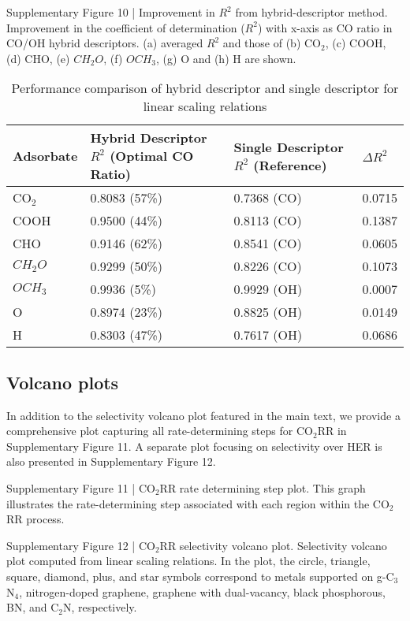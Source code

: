 Supplementary Figure 10 | Improvement in $R^2$ from hybrid-descriptor method. Improvement in the coefficient of determination ($R^2$) with x-axis as CO ratio in CO/OH hybrid descriptors. (a) averaged $R^2$ and those of (b) CO$_2$, (c) COOH, (d) CHO, (e) $CH_2O$, (f) $OCH_3$, (g) O and (h) H are shown.

\begin{table}[h]
  \centering
  \begin{tabular}{*{4}{l}}
    \hline
    Adsorbate & Hybrid Descriptor $R^2$ (Optimal CO Ratio) & Single Descriptor $R^2$ (Reference) & $\Delta R^2$ \\
    \hline
    CO$_2$    & 0.8083 (57\%)  & 0.7368 (CO)  & 0.0715 \\
    COOH      & 0.9500 (44\%)  & 0.8113 (CO)  & 0.1387 \\
    CHO       & 0.9146 (62\%)  & 0.8541 (CO)  & 0.0605 \\
    $CH_2O$   & 0.9299 (50\%)  & 0.8226 (CO)  & 0.1073 \\
    $OCH_3$   & 0.9936 (5\%)   & 0.9929 (OH)  & 0.0007 \\
    O         & 0.8974 (23\%)  & 0.8825 (OH)  & 0.0149 \\
    H         & 0.8303 (47\%)  & 0.7617 (OH)  & 0.0686 \\
    \hline
  \end{tabular}
  \caption{Performance comparison of hybrid descriptor and single descriptor for linear scaling relations}
  \label{si_table14}
\end{table}


\subsection{Volcano plots}
In addition to the selectivity volcano plot featured in the main text, we provide a comprehensive plot capturing all rate-determining steps for CO$_2$RR in Supplementary Figure 11. A separate plot focusing on selectivity over HER is also presented in Supplementary Figure 12.


Supplementary Figure 11 | CO$_2$RR rate determining step plot. This graph illustrates the rate-determining step associated with each region within the CO$_2$RR process.


Supplementary Figure 12 | CO$_2$RR selectivity volcano plot. Selectivity volcano plot computed from linear scaling relations. In the plot, the circle, triangle, square, diamond, plus, and star symbols correspond to metals supported on g-C$_3$N$_4$, nitrogen-doped graphene, graphene with dual-vacancy, black phosphorous, BN, and C$_2$N, respectively.


